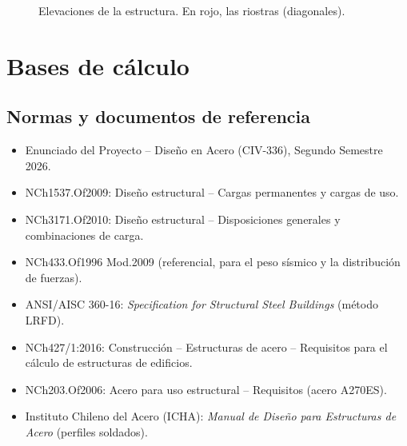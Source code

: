 \documentclass[11pt,letterpaper]{article}
\begin{document}
\begin{figure}[H]
\caption{Elevaciones de la estructura. En rojo, las riostras (diagonales).}
\label{fig:elev}
\end{figure}

\section{Bases de cálculo}

\subsection{Normas y documentos de referencia}
\begin{itemize}
  \item Enunciado del Proyecto -- Diseño en Acero (CIV-336), Segundo Semestre 2026.
  \item NCh1537.Of2009: Diseño estructural -- Cargas permanentes y cargas de uso.
  \item NCh3171.Of2010: Diseño estructural -- Disposiciones generales y combinaciones de carga.
  \item NCh433.Of1996 Mod.2009 (referencial, para el peso sísmico y la distribución de fuerzas).
  \item ANSI/AISC 360-16: \emph{Specification for Structural Steel Buildings} (método LRFD).
  \item NCh427/1:2016: Construcción -- Estructuras de acero -- Requisitos para el cálculo de estructuras de edificios.
  \item NCh203.Of2006: Acero para uso estructural -- Requisitos (acero A270ES).
  \item Instituto Chileno del Acero (ICHA): \emph{Manual de Diseño para Estructuras de Acero} (perfiles soldados).
\end{itemize}
\end{document}
